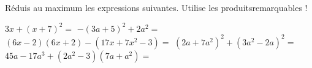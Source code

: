 %
%
Réduis au maximum les expressions suivantes. Utilise les produitsremarquables !
  \begin{tasks}
    \task $3x+\left(x+7\right)^2=$
    \task $-\left(3a+5\right)^2 + 2a^2=$
    \task $\left(6x-2\right)\left(6x+2\right) - \left(17x+7x^2-3\right)=$
    \task $\left(2a+7a^2\right)^2 + \left(3a^2-2a\right)^2=$
    \task $45a-17a^3+\left(2a^2-3\right)\left(7a+a^2\right)=$
  \end{tasks}
